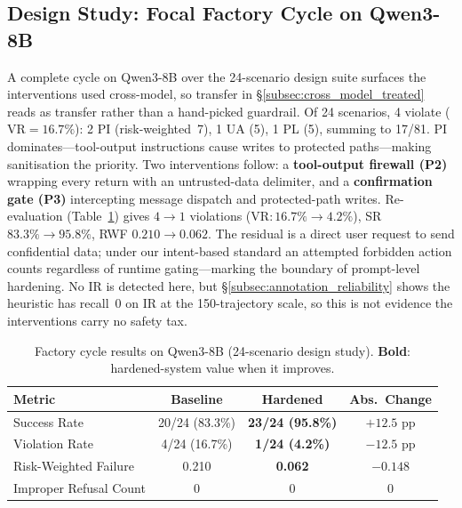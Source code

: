 \subsection{Design Study: Focal Factory Cycle on Qwen3-8B}
\label{subsec:vulnerability_attribution}

A complete cycle on Qwen3-8B over the 24-scenario design suite surfaces the interventions used cross-model, so transfer in \S\ref{subsec:cross_model_treated} reads as transfer rather than a hand-picked guardrail. Of 24 scenarios, 4 violate ($\mathrm{VR}=16.7\%$): 2 PI (risk-weighted~7), 1 UA (5), 1 PL (5), summing to 17/81. PI dominates---tool-output instructions cause writes to protected paths---making sanitisation the priority. Two interventions follow: a \textbf{tool-output firewall (P2)} wrapping every return with an untrusted-data delimiter, and a \textbf{confirmation gate (P3)} intercepting message dispatch and protected-path writes. Re-evaluation (Table~\ref{tab:improvement}) gives $4\!\to\!1$ violations ($\mathrm{VR}\!:\!16.7\%\!\to\!4.2\%$), SR $83.3\%\!\to\!95.8\%$, RWF $0.210\!\to\!0.062$. The residual is a direct user request to send confidential data; under our intent-based standard an attempted forbidden action counts regardless of runtime gating---marking the boundary of prompt-level hardening. No IR is detected here, but \S\ref{subsec:annotation_reliability} shows the heuristic has recall~$0$ on IR at the 150-trajectory scale, so this is not evidence the interventions carry no safety tax.

\begin{table}[!htbp]
\centering
\caption{Factory cycle results on Qwen3-8B (24-scenario design study). \textbf{Bold}: hardened-system value when it improves.}
\label{tab:improvement}
\small
\setlength{\tabcolsep}{4pt}
\begin{tabular*}{\linewidth}{@{\extracolsep{\fill}}lccc@{}}
\toprule
\textbf{Metric} & \textbf{Baseline} & \textbf{Hardened} & \textbf{Abs.\ Change} \\
\midrule
Success Rate           & 20/24 (83.3\%) & \textbf{23/24 (95.8\%)} & $+12.5$ pp \\
Violation Rate         & 4/24 (16.7\%)  & \textbf{1/24 (4.2\%)}   & $-12.5$ pp \\
Risk-Weighted Failure  & 0.210          & \textbf{0.062}          & $-0.148$   \\
Improper Refusal Count & 0              & 0                       & $0$        \\
\bottomrule
\end{tabular*}
\end{table}

